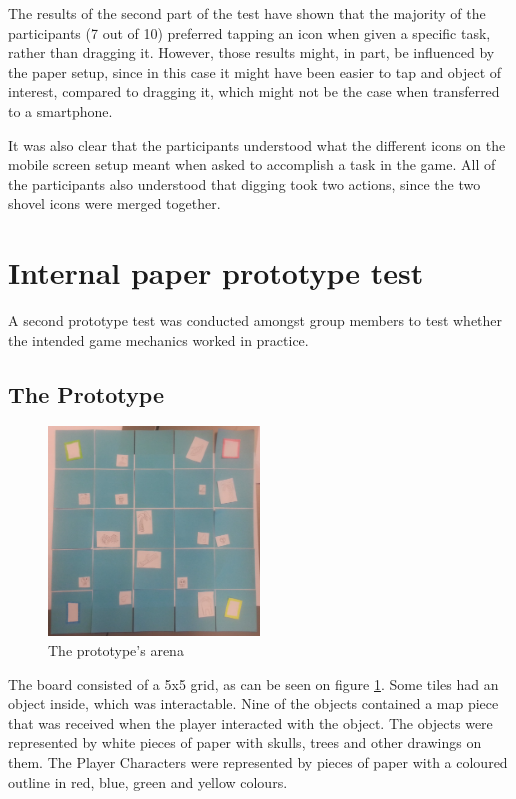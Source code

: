 The results of the second part of the test have shown that the majority of the participants (7 out of 10) preferred tapping an icon when given a specific task, rather than dragging it. However, those results might, in part, be influenced by the paper setup, since in this case it might have been easier to tap and object of interest, compared to dragging it, which might not be the case when transferred to a smartphone. 

It was also clear that the participants understood what the different icons on the mobile screen setup meant when asked to accomplish a task in the game. All of the participants also understood that digging took two actions, since the two shovel icons were merged together. 

\section{Internal paper prototype test}
A second prototype test was conducted amongst group members to test whether the intended game mechanics worked in practice.

\subsection{The Prototype}
\begin{figure}[h] 
\centering 
\includegraphics[width=0.5\textwidth]{figures/PPtestArena}
\caption{The prototype's arena} \label{fig:PPtest1}
\end{figure}
The board consisted of a 5x5 grid, as can be seen on figure \ref{fig:PPtest1}. Some tiles had an object inside, which was interactable. Nine of the objects contained a map piece that was received when the player interacted with the object. The objects were represented by white pieces of paper with skulls, trees and other drawings on them. The Player Characters were represented by pieces of paper with a coloured outline in red, blue, green and yellow colours.

